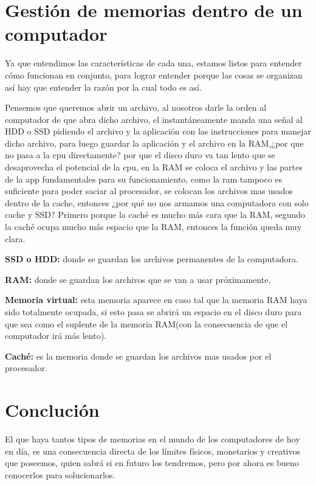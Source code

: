 \documentclass{article}
\begin{document}
\section{Gestión de memorias dentro de un computador}
\vspace{1cm}

Ya que entendimos las características de cada una, estamos listos para entender cómo funcionan en conjunto, para lograr entender porque las cosas se organizan así hay que entender la razón por la cual todo es así.
\vspace{0.4cm}

Pensemos que queremos abrir un archivo, al nosotros darle la orden al computador de que abra dicho archivo, el instantáneamente manda una señal al HDD o SSD pidiendo el archivo y la aplicación con las instrucciones para manejar dicho archivo, para luego guardar la aplicación y el archivo en la RAM,¿por que no pasa a la cpu directamente? por que el disco duro va tan lento que se desaprovecha el potencial de la cpu, en la RAM se coloca el archivo y las partes de la app fundamentales para su funcionamiento, como la ram tampoco es suficiente para poder saciar al procesador, se colocan los archivos mas usados dentro de la cache, entonces ¿por qué no nos armamos una computadora con solo cache y SSD? Primero porque la caché es mucho más cara que la RAM, segundo la caché ocupa mucho más espacio que la RAM, entonces la función queda muy clara.\cite{pdfu}
\vspace{0.4cm}

\textbf{SSD o HDD:} donde se guardan los archivos permanentes de la 
computadora.
\vspace{0.4cm}

\textbf{RAM:} donde se guardan los archivos que se van a usar próximamente.
\vspace{0.4cm}

\textbf{Memoria virtual:} esta memoria aparece en caso tal que la memoria RAM haya sido totalmente ocupada, si esto pasa se abrirá un espacio en el disco duro para que sea como el suplente de la memoria RAM(con la consecuencia de que el computador irá más lento).
\vspace{0.4cm}

\textbf{Caché:} es la memoria donde se guardan los archivos mas usados por el procesador. 
\vspace{3cm}
\newpage
\section{Conclución}
\vspace{1cm}
El que haya tantos tipos de memorias en el mundo de los computadores de hoy en día, es una consecuencia directa de los límites físicos, monetarios y creativos que poseemos, quien sabrá si en futuro los tendremos, pero por ahora es bueno conocerlos para solucionarlos.
\vspace{3cm}





\end{document}
